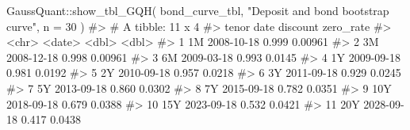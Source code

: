 \documentclass[
  letterpaper,
  DIV=11,
  numbers=noendperiod]{scrreprt}
\newenvironment{Shaded}{\begin{snugshade}}{\end{snugshade}}
\newcommand{\AttributeTok}[1]{\textcolor[rgb]{0.40,0.45,0.13}{#1}}
\newcommand{\CommentTok}[1]{\textcolor[rgb]{0.37,0.37,0.37}{#1}}
\newcommand{\ConstantTok}[1]{\textcolor[rgb]{0.56,0.35,0.01}{#1}}
\newcommand{\DecValTok}[1]{\textcolor[rgb]{0.68,0.00,0.00}{#1}}
\newcommand{\FunctionTok}[1]{\textcolor[rgb]{0.28,0.35,0.67}{#1}}
\newcommand{\NormalTok}[1]{\textcolor[rgb]{0.00,0.23,0.31}{#1}}
\newcommand{\OtherTok}[1]{\textcolor[rgb]{0.00,0.23,0.31}{#1}}
\newcommand{\SpecialCharTok}[1]{\textcolor[rgb]{0.37,0.37,0.37}{#1}}
\newcommand{\StringTok}[1]{\textcolor[rgb]{0.13,0.47,0.30}{#1}}
\begin{document}
\begin{Shaded}
\begin{Highlighting}[]
\NormalTok{GaussQuant}\SpecialCharTok{::}\FunctionTok{show\_tbl\_GQH}\NormalTok{(}
\NormalTok{  bond\_curve\_tbl,}
  \StringTok{"Deposit and bond bootstrap curve"}\NormalTok{,}
  \AttributeTok{n =} \DecValTok{30}
\NormalTok{)}
\CommentTok{\#\textgreater{} \# A tibble: 11 x 4}
\CommentTok{\#\textgreater{}    tenor date       discount zero\_rate}
\CommentTok{\#\textgreater{}    \textless{}chr\textgreater{} \textless{}date\textgreater{}        \textless{}dbl\textgreater{}     \textless{}dbl\textgreater{}}
\CommentTok{\#\textgreater{}  1 1M    2008{-}10{-}18    0.999   0.00961}
\CommentTok{\#\textgreater{}  2 3M    2008{-}12{-}18    0.998   0.00961}
\CommentTok{\#\textgreater{}  3 6M    2009{-}03{-}18    0.993   0.0145 }
\CommentTok{\#\textgreater{}  4 1Y    2009{-}09{-}18    0.981   0.0192 }
\CommentTok{\#\textgreater{}  5 2Y    2010{-}09{-}18    0.957   0.0218 }
\CommentTok{\#\textgreater{}  6 3Y    2011{-}09{-}18    0.929   0.0245 }
\CommentTok{\#\textgreater{}  7 5Y    2013{-}09{-}18    0.860   0.0302 }
\CommentTok{\#\textgreater{}  8 7Y    2015{-}09{-}18    0.782   0.0351 }
\CommentTok{\#\textgreater{}  9 10Y   2018{-}09{-}18    0.679   0.0388 }
\CommentTok{\#\textgreater{} 10 15Y   2023{-}09{-}18    0.532   0.0421 }
\CommentTok{\#\textgreater{} 11 20Y   2028{-}09{-}18    0.417   0.0438}
\end{Highlighting}
\end{Shaded}

\begin{Shaded}
\end{Shaded}
\end{document}
